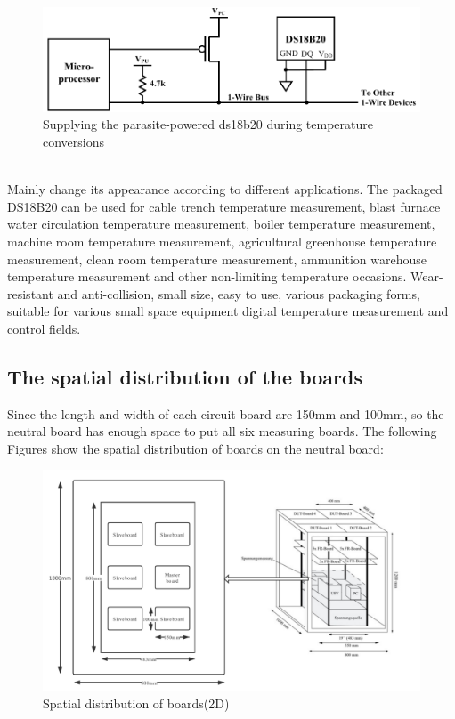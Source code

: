 \begin{figure}[!ht]
	\centering
	\includegraphics[width=15cm]{grafiken/5.1.pdf}
	\caption{Supplying the parasite-powered ds18b20 during temperature conversions} 
	\label{fig:5.1}
\end{figure}
\FloatBarrier
\\
Mainly change its appearance according to different applications. The packaged DS18B20 can be used for cable trench temperature measurement, blast furnace water circulation temperature measurement, boiler temperature measurement, machine room temperature measurement, agricultural greenhouse temperature measurement, clean room temperature measurement, ammunition warehouse temperature measurement and other non-limiting temperature occasions. Wear-resistant and anti-collision, small size, easy to use, various packaging forms, suitable for various small space equipment digital temperature measurement and control fields.

\subsection{The spatial distribution of the boards}
\label{sec:The spatial distribution of the boards}
Since the length and width of each circuit board are 150mm and 100mm, so the neutral board has enough space to put all six measuring boards. The following Figures show the spatial distribution of boards on the neutral board:
\begin{figure}[!ht]
	\centering
	\includegraphics[width=16cm]{grafiken/5.2.pdf}
	\caption{Spatial distribution of boards(2D)} 
	\label{fig:5.2}
\end{figure}
\FloatBarrier
\\

